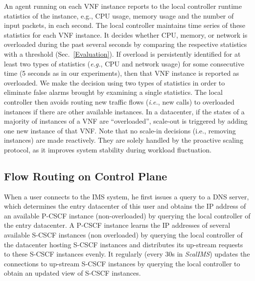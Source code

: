 An agent running on each VNF instance reports to the local controller runtime statistics of the instance, e.g., CPU usage, memory usage and the number of input packets, in each second. The local controller maintains time series of these statistics for each VNF instance. It decides whether CPU, memory, or network is overloaded during the past several seconds by comparing the respective statistics with a threshold (Sec.~\ref{Evaluation}). If overload is persistently identified for at least two types of statistics ({\em e.g.}, CPU and network usage) for some consecutive time (5 seconds as in our experiments), then that VNF instance is reported as overloaded. We make the decision using two types of statistics in order to eliminate false alarms brought by examining a single statistics. The local controller then avoids routing new traffic flows ({\em i.e.}, new calls) to overloaded instances if there are other available instances. In a datacenter, if the states of a majority of instances of a VNF are ``overloaded'', scale-out is triggered by adding one new instance of that VNF. Note that no scale-in decisions (i.e., removing instances) are made reactively. They are solely handled by the proactive scaling protocol, as it improves system stability during workload fluctuation.

\vspace{-3mm}
\subsection{Flow Routing on Control Plane}
\label{sec:message-routing-on-control-plane}

When a user connects to the IMS system, he first issues a query to a DNS server, which determines the entry datacenter of this user and obtains the IP address of an available P-CSCF instance (non-overloaded) by querying the local controller of the entry datacenter. A P-CSCF instance learns the IP addresses of several available S-CSCF instances (non overloaded) by querying the local controller of the datacenter hosting S-CSCF instances and distributes its up-stream requests to these S-CSCF instances evenly. It regularly (every 30s in \textit{ScalIMS}) updates the connections to up-stream S-CSCF instances by querying the local controller to obtain an updated view of S-CSCF instances.


